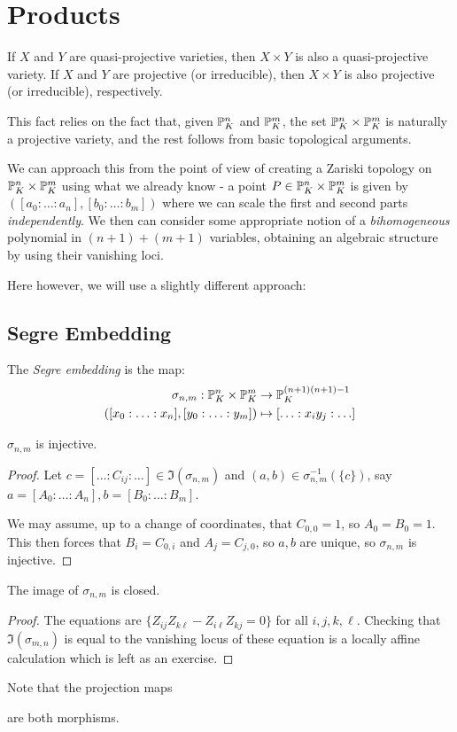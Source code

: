 \documentclass[10pt,a4paper,rgb]{article}
\begin{document}
\section{Products}
If $X$ and $Y$ are quasi-projective varieties, then $X \times Y$ is also a quasi-projective variety. If $X$ and $Y$ are projective (or irreducible), then $X \times Y$ is also projective (or irreducible), respectively.

This fact relies on the fact that, given $\P^n_K$ and $\P^m_K$, the set $\P^n_K \times \P^m_K$ is naturally a projective variety, and the rest follows from basic topological arguments.

We can approach this from the point of view of creating a Zariski topology on $\P^n_K \times \P^m_K$ using what we already know - a point $P \in \P^n_K \times \P^m_K$ is given by $([a_0:\ldots:a_n],[b_0:\ldots:b_m])$ where we can scale the first and second parts \textit{independently}. We then can consider some appropriate notion of a \emph{bihomogeneous} polynomial in $(n+1)+(m+1)$ variables, obtaining an algebraic structure by using their vanishing loci.

Here however, we will use a slightly different approach:
\subsection{Segre Embedding}
The \emph{Segre embedding} is the map:
\begin{align*}
\sigma_{n,m}:\P^n_K \times \P^m_K &\to \P^{(n+1)(n+1)-1}_K\\
([x_0:\ldots:x_n],[y_0:\ldots:y_m]) &\mapsto [\ldots: x_iy_j:\ldots]
\end{align*}
\begin{claim}
$\sigma_{n,m}$ is injective.
\end{claim}
\begin{proof}
Let $c = [\ldots:C_{ij}:\ldots] \in \Im(\sigma_{n,m})$ and $(a,b) \in \sigma_{n,m}^{-1}(\{c\})$, say $a = [A_0:\ldots:A_n], b = [B_0:\ldots:B_m]$.

We may assume, up to a change of coordinates, that $C_{0,0} = 1$, so $A_0 = B_0 = 1$. This then forces that $B_i = C_{0,i}$ and $A_j = C_{j,0}$, so $a,b$ are unique, so $\sigma_{n,m}$ is injective.
\end{proof}
\begin{claim}
The image of $\sigma_{n,m}$ is closed.
\end{claim}
\begin{proof}
The equations are $\{Z_{ij}Z_{k\ell} - Z_{i\ell}Z_{kj} = 0\}$ for all $i,j,k,\ell$. Checking that $\Im(\sigma_{m,n})$ is equal to the vanishing locus of these equation is a locally affine calculation which is left as an exercise.
\end{proof}
Note that the projection maps
are both morphisms.
\end{document}
